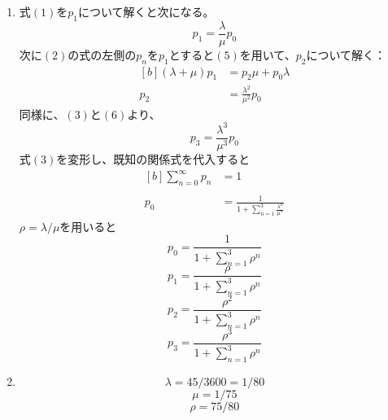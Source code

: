 \documentclass{report}
\begin{document}
\begin{CJK}{UTF8}{min}
\begin{enumerate}
        \item
              式$(1)$を$p_1$について解くと次になる。
              \begin{equation}
                  p_1=\frac{\lambda}{\mu}p_0
              \end{equation}
              次に$(2)$の式の左側の$p_n$を$p_1$とすると$(5)$を用いて、$p_2$について解く：
              \begin{equation}
                  \begin{aligned}[b]
                      (\lambda+\mu)p_1 & =p_{2}\mu+p_{0}\lambda      \\
                      p_{2}            & =\frac{\lambda^2}{\mu^2}p_0
                  \end{aligned}
              \end{equation}
              同様に、$(3)$と$(6)$より、
              \begin{equation}
                  p_3=\frac{\lambda^3}{\mu^3}p_0
              \end{equation}
              式$(3)$を変形し、既知の関係式を代入すると
              \begin{equation}
                  \begin{aligned}[b]
                      \sum_{n=0}^\infty p_n & =1                                                \\                                                                                                \\
                      p_0                   & =\frac{1}{1+\sum_{n=1}^3 \frac{\lambda^n}{\mu^n}}
                  \end{aligned}
              \end{equation}
              $\rho=\lambda/\mu$を用いると
              \begin{equation}
                  p_0=\frac{1}{1+\sum_{n=1}^3 \rho^n}
              \end{equation}
              \begin{equation}
                  p_1=\frac{\rho}{1+\sum_{n=1}^3 \rho^n}
              \end{equation}
              \begin{equation}
                  p_2=\frac{\rho^2}{1+\sum_{n=1}^3 \rho^n}
              \end{equation}
              \begin{equation}
                  p_3=\frac{\rho^3}{1+\sum_{n=1}^3 \rho^n}
              \end{equation}
        \item
              \begin{equation}
                  \lambda=45/3600=1/80
              \end{equation}
              \begin{equation}
                  \mu=1/75
              \end{equation}
              \begin{equation}
                  \rho=75/80
              \end{equation}


\end{enumerate}
\end{CJK}
\end{document}
